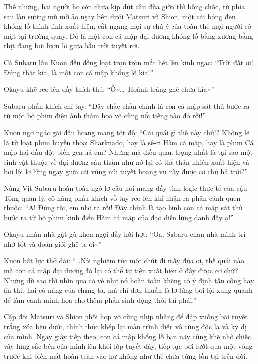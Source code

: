 \documentclass[../main.tex]{subfiles}
\begin{document}
Thế nhưng, hai người họ còn chưa kịp dứt câu đùa giỡn thì bỗng chốc, từ phía sau làn sương mù mờ ảo ngay bên dưới Matsuri và Shion, một cái bóng đen khổng lồ thình lình xuất hiện, cắt ngang mọi sự chú ý của toàn thể mọi người có mặt tại trường quay. Đó là một con cá mập đại dương khổng lồ bằng xương bằng thịt đang bơi lượn lờ giữa bầu trời tuyết rơi.

Cả Subaru lẫn Kuon đều đồng loạt trợn tròn mắt hét lên kinh ngạc: ``Trời đất ơi! Đúng thật kìa, là một con cá mập khổng lồ kìa!''

Okayu khẽ reo lên đầy thích thú: ``Ồ\~{}\dots\ Hoành tráng ghê chưa kìa\~{}''

Subaru phấn khích chỉ tay: ``Đây chắc chắn chính là con cá mập sát thủ bước ra từ một bộ phim điện ảnh thảm họa vô cùng nổi tiếng nào đó rồi!''

Kuon ngơ ngác gãi đầu hoang mang tột độ: ``Cái quái gì thế này chứ!? Không lẽ là từ loạt phim huyền thoại Sharknado, hay là sê-ri Hàm cá mập, hay là phim Cá mập hai đầu đột biến gen hả em? Nhưng mà điều quan trọng nhất là tại sao một sinh vật thuộc về đại dương sâu thẳm như nó lại có thể thản nhiên xuất hiện và bơi lội lơ lửng ngay giữa cái vùng núi tuyết hoang vu này được cơ chứ hả trời?''

Nàng Vịt Subaru hoàn toàn ngó lơ câu hỏi mang đầy tính logic thực tế của cậu Tổng quản lý, cô nàng phấn khích vỗ tay reo lên khi nhận ra phân cảnh quen thuộc: ``A! Đúng rồi, em nhớ ra rồi! Đây chính là tạo hình con cá mập sát thủ bước ra từ bộ phim kinh điển Hàm cá mập của đạo diễn lừng danh đấy ạ!''

Okayu nhàn nhã gật gù khen ngợi đầy hời hợt: ``Oa, Subaru-chan nhà mình trí nhớ tốt và đoán giỏi ghê ta ơi\~{}''

Kuon bất lực thở dài: ``\dots Nói nghiêm túc một chút đi mấy đứa ơi, thế quái nào mà con cá mập đại dương đó lại có thể tự tiện xuất hiện ở đây được cơ chứ? Nhưng dù sao thì nhìn qua có vẻ như nó hoàn toàn không có ý định tấn công hay ăn thịt hai cô nàng của chúng ta, mà chỉ đơn thuần là lơ lửng bơi lội xung quanh để làm cảnh minh họa cho thêm phần sinh động thôi thì phải.''

Cặp đôi Matsuri và Shion phối hợp vô cùng nhịp nhàng để đáp xuống bãi tuyết trắng xóa bên dưới, chính thức khép lại màn trình diễn vô cùng độc lạ và kỳ dị của mình. Ngay giây tiếp theo, con cá mập khổng lồ ban nãy cũng khẽ nhô chiếc vây lưng sắc bén của mình lên khỏi lớp tuyết dày, tiếp tục bơi lướt qua một vòng trước khi biến mất hoàn toàn vào hư không như thể chưa từng tồn tại trên đời.
\end{document}
